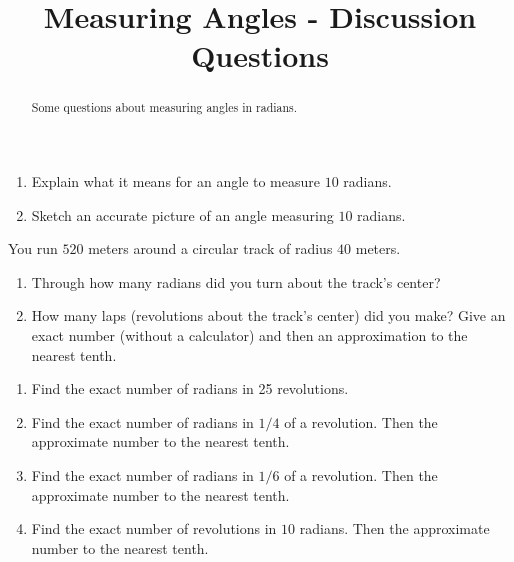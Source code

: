 \documentclass{ximera}
\title{Measuring Angles - Discussion Questions}
\begin{document}
\begin{abstract}
Some questions about measuring angles in radians.
\end{abstract}
\maketitle



\begin{question} \label{QPodferhmmre}
\begin{enumerate}
\item Explain what it means for an angle to measure $10$ radians.

\item Sketch an accurate picture of an angle measuring $10$ radians. 

\end{enumerate}
\end{question}


\begin{question} \label{QOIERder3333}

You run $520$ meters around a circular track of radius $40$ meters. 

\begin{enumerate}

\item Through how many radians did you turn about the track's center?

\item How many laps (revolutions about the track's center) did you make? Give an exact number (without a calculator) and then an approximation to the nearest tenth.

\end{enumerate} 
\end{question}


\begin{question}  \label{Q9df3DDgZZ}
\begin{enumerate}
\item Find the exact number of radians in 25 revolutions.

\item Find the exact number of radians in $1/4$ of a revolution. Then the approximate number to the nearest tenth.

\item Find the exact number of radians in $1/6$ of a revolution. Then the approximate number to the nearest tenth.

\item Find the exact number of revolutions in $10$ radians. Then the approximate number to the nearest tenth.




\end{enumerate}
\end{question}
\end{document}
